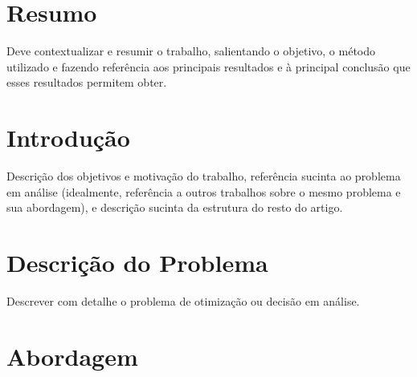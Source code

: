 \documentclass[a4paper]{article}
\begin{document}

\newpage

\section{Resumo}

Deve contextualizar e resumir o trabalho, salientando o objetivo, o método utilizado e fazendo referência aos principais resultados e à principal conclusão que esses resultados permitem obter.

\newpage

\tableofcontents



\newpage

\section{Introdução}

Descrição dos objetivos e motivação do trabalho, referência sucinta ao problema em análise (idealmente, referência a outros trabalhos sobre o mesmo problema e sua abordagem), e descrição sucinta da estrutura do resto do artigo.

\newpage

\section{Descrição do Problema}

Descrever com detalhe o problema de otimização ou decisão em análise.

\newpage

\section{Abordagem}
\end{document}
